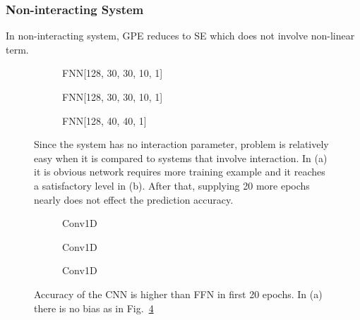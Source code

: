 \documentclass[a4paper,times,12pt]{article}
\begin{document}
\subsubsection{Non-interacting System}

In non-interacting system, GPE reduces to SE which does not involve non-linear term. 

\begin{figure}[H]
    \centering
    \begin{subfigure}[t]{0.45\textwidth}
		\centering
        
        \caption{FNN[128, 30, 30, 10, 1]}
		\label{fig:a}
    \end{subfigure}\hfill
    \begin{subfigure}[t]{0.45\textwidth}
		\centering
        
        \caption{FNN[128, 30, 30, 10, 1]}
		\label{fig:b}
    \end{subfigure}\hfill    
    \begin{subfigure}[t]{0.45\textwidth}
        \centering
        
        \caption{FNN[128, 40, 40, 1]}
		\label{fig:c}
    \end{subfigure}
    \caption{Since the system has no interaction parameter, problem is relatively easy when it is compared to systems that involve interaction. In (a) it is obvious network requires more training example and it reaches a satisfactory level in (b). After that, supplying 20 more epochs nearly does not effect the prediction accuracy.}
\label{fig:FFN-g-0}
\end{figure}


\begin{figure}[H]
    \centering
    \begin{subfigure}[t]{0.45\textwidth}
		\centering
        
        \caption{Conv1D}
		\label{fig:a}
    \end{subfigure}\hfill
    \begin{subfigure}[t]{0.45\textwidth}
		\centering
        
        \caption{Conv1D}
		\label{fig:b}
    \end{subfigure}\hfill    
    \begin{subfigure}[t]{0.45\textwidth}
        \centering
        
        \caption{Conv1D}
		\label{fig:c}
    \end{subfigure}
    \caption{Accuracy of the CNN is higher than FFN in first 20 epochs. In (a) there is no bias as in Fig.~\ref{fig:FFN-g-0}}
\end{figure}
\end{document}
